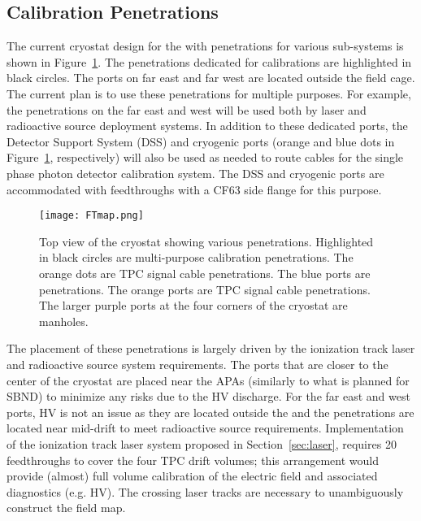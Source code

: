 \subsection{Calibration Penetrations}
\label{sec:FTs}

The current cryostat design for the %
\spmod with penetrations for various sub-systems is shown in Figure~\ref{fig:ftmap}. The penetrations dedicated for calibrations are highlighted in black circles. The ports on far east and far west are located outside the field cage. The current plan is to use these penetrations for multiple purposes. For example, the penetrations on the far east and west will be used both by laser and radioactive source deployment systems. In addition to these dedicated ports, the Detector Support System (DSS) and cryogenic ports (orange and blue dots in Figure~\ref{fig:ftmap}, respectively) will also be used as needed to route cables for the single phase photon detector calibration system. The DSS and cryogenic ports are accommodated with feedthroughs with a CF63 side flange for this purpose.   

\begin{figure}[tbp]
\centering
\texttt{[image: FTmap.png]}
\caption{Top view of the \spmod %
cryostat showing various penetrations. Highlighted in black circles are multi-purpose calibration penetrations. The orange dots are TPC signal cable penetrations. The blue ports are  %
penetrations. The orange ports are TPC signal cable penetrations. The larger purple ports at the four corners of the cryostat are manholes.}
\label{fig:ftmap}
\end{figure}

The placement of these penetrations is largely driven by the ionization track laser and radioactive source system requirements. The ports that are closer to the center of the cryostat 
are placed near the APAs (similarly to what is planned for SBND) to minimize any risks due to the HV discharge. For the far east and west ports, HV is not an issue as they are located outside the  and the penetrations are located near mid-drift to meet radioactive source requirements. Implementation of the ionization track laser system proposed in Section~\ref{sec:laser}, requires 20 feedthroughs to cover the four TPC drift volumes; %
this arrangement would provide (almost) full volume calibration of the electric field 
and associated diagnostics (e.g. HV). The crossing laser tracks are necessary to unambiguously construct the field map. 

